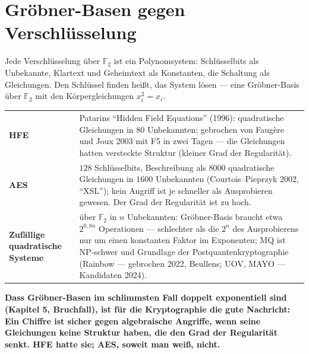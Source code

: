 \section{Gröbner-Basen gegen Verschlüsselung}

\begin{merksatz}
Jede Verschlüsselung über $\mathbb F_2$ ist ein Polynomsystem: Schlüsselbits als Unbekannte, Klartext und Geheimtext als Konstanten, die Schaltung als Gleichungen. Den Schlüssel finden heißt, das System lösen --- eine Gröbner-Basis über $\mathbb F_2$ mit den Körpergleichungen $x_i^{2} = x_i$.

\begin{center}
{\small
\renewcommand{\arraystretch}{1.5}
\begin{tabular}{@{}P{3.0cm}P{5.8cm}@{}}
\toprule
\textbf{HFE} & Patarins \enquote{Hidden Field Equations} (1996): quadratische Gleichungen in $80$ Unbekannten; gebrochen von Faugère und Joux 2003 mit F5 in zwei Tagen --- die Gleichungen hatten versteckte Struktur (kleiner Grad der Regularität).\\
\textbf{AES} & $128$ Schlüsselbits, Beschreibung als $8000$ quadratische Gleichungen in $1600$ Unbekannten (Courtois--Pieprzyk 2002, \enquote{XSL}); kein Angriff ist je schneller als Ausprobieren gewesen. Der Grad der Regularität ist zu hoch.\\
\textbf{Zufällige quadratische Systeme} & über $\mathbb F_2$ in $n$ Unbekannten: Gröbner-Basis braucht etwa $2^{0{,}8n}$ Operationen --- schlechter als die $2^{n}$ des Ausprobierens nur um einen konstanten Faktor im Exponenten; MQ ist NP-schwer und Grundlage der Postquantenkryptographie (Rainbow --- gebrochen 2022, Beullens; UOV, MAYO --- Kandidaten 2024).\\
\bottomrule
\end{tabular}}
\end{center}

\begin{center}
\begin{minipage}{0.9\textwidth}
\textbf{Dass Gröbner-Basen im schlimmsten Fall doppelt exponentiell sind (Kapitel 5, Bruchfall), ist für die Kryptographie die gute Nachricht: Ein Chiffre ist sicher gegen algebraische Angriffe, wenn seine Gleichungen keine Struktur haben, die den Grad der Regularität senkt. HFE hatte sie; AES, soweit man weiß, nicht.}
\end{minipage}
\end{center}


\end{merksatz}
